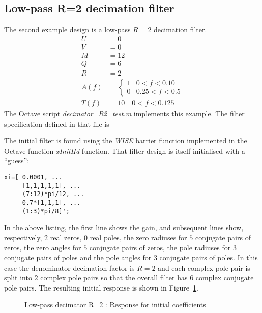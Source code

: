 \documentclass[a4paper,twoside,10pt,english]{report}
\begin{document}
\subsection{\label{sec:Low-pass-R-2-decimation-filter}Low-pass R=2 decimation filter}
The second example design is a low-pass $R=2$ decimation filter.
\begin{align*}
U &= 0\\
V &= 0\\
M &= 12\\
Q &= 6\\
R &= 2\\
A\left(f\right) &= \begin{cases}
1 & 0<f<0.10\\
0 & 0.25<f<0.5
\end{cases}\\
T\left(f\right) &= 10 \quad 0<f<0.125
\end{align*}
The Octave script \emph{decimator\_R2\_test.m} implements this example.  The
filter specification defined in that file is
\begin{small}

\end{small}
The initial filter is found using the \emph{WISE} barrier function implemented in
the Octave function \emph{xInitHd} function. That filter design is itself
initialised with a ``guess'':
\begin{small}
\begin{verbatim}
xi=[ 0.0001, ...
     [1,1,1,1,1], ...
     (7:12)*pi/12, ...
     0.7*[1,1,1], ...
     (1:3)*pi/8]';
\end{verbatim}
\end{small}
In the above listing, the first line shows the gain, and subsequent lines show,
respectively, $2$ real zeros, $0$ real poles, the zero radiuses for $5$
conjugate pairs of zeros, the zero angles for $5$ conjugate pairs of zeros, the
pole radiuses for $3$ conjugate pairs of poles and the pole angles for $3$
conjugate pairs of poles. In this case the denominator decimation
factor is $R=2$ and each complex pole pair is split into $2$ complex pole pairs
so that the overall filter has $6$ complex conjugate pole pairs.
The resulting initial response is shown in 
Figure~\ref{fig:Decimator-R-2-Initial-x0}. 
\begin{figure}[!htbp]
\begin{center}
\scalebox{0.7}{}
\caption{Low-pass decimator R=2 : Response for initial coefficients}
\label{fig:Decimator-R-2-Initial-x0}
\end{center}
\end{figure}
\end{document}
